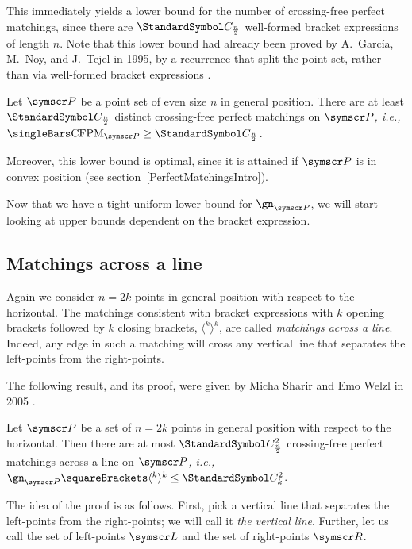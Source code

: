 \documentclass[10pt, a4paper, twoside]{basestyle}
\newcommand{\idest}{\emph{, i.e.,\ }}
\DeclareMathOperator{\CFPM}{CFPM}
\newcommand{\CatalanNumber}[1]{\StandardSymbol C_{#1}}
\newcommand{\pointset}{\symscr}
\begin{document}
This immediately yields a lower bound for the number of crossing-free perfect matchings, since
there are $\CatalanNumber {\frac n 2}$ well-formed bracket expressions of length $n$.
Note that this lower bound had already been proved by A.~García, M.~Noy, and J.~Tejel in 1995,
by a recurrence that split the point set, rather than via well-formed bracket expressions
\cite{GarciaNoyTejel2000}.
\begin{corollary}
Let $\pointset P$ be a point set of even size $n$ in general position. There are at least $\CatalanNumber {\frac n 2}$ distinct
crossing-free perfect matchings on $\pointset P$\idest $\Cardinality{\CFPM_{\pointset P}} \geq \CatalanNumber {\frac n 2}$.
\end{corollary}
Moreover, this lower bound is optimal, since it is attained if $\pointset P$ is in convex position (see
section~\ref{PerfectMatchingsIntro}).

Now that we have a tight uniform lower bound for $\gn_{\pointset P}$, we will start looking at upper bounds
dependent on the bracket expression.
\subsection{Matchings across a line}
Again we consider $n=2k$ points in general position with respect to the horizontal.
The matchings consistent with bracket expressions with $k$ opening brackets followed
by $k$ closing brackets, $\langle^k\rangle^k$, are called \emph{matchings
across a line}. Indeed, any edge in such a matching will cross any vertical line that separates
the left-points from the right-points.

The following result, and its proof, were given by Micha Sharir and Emo Welzl in 2005 \cite{SharirWelzl2006}.
\NoEndMark
\begin{theorem}
Let $\pointset P$ be a set of $n=2k$ points in general position with respect to the horizontal.
Then there are at most $\CatalanNumber {\frac n 2}^2$ crossing-free perfect matchings across a line on $\pointset P$\idest
$\gn_{\pointset P}\of {\langle^k\rangle^k} \leq \CatalanNumber k^2$.
\end{theorem}
The idea of the proof is as follows.
First, pick a vertical line that separates the left-points from the right-points;
we will call it \emph{the vertical line}.
Further, let us call the set of left-points $\pointset L$ and the set of right-points $\pointset R$.
\end{document}
